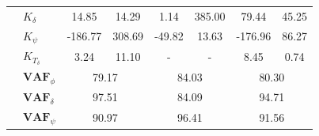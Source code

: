 \begin{table}[]
\begin{tabular}{llcccccc}
                                 & $K_\delta $           & 14.85                                      & 14.29                                              & 1.14                                       & 385.00                                             & 79.44                                      & 45.25                                              \\
                                 & $K_\psi $             & -186.77                                    & 308.69                                             & -49.82                                     & 13.63                                              & -176.96                                    & 86.27                                              \\
                                 & $K_{T_\delta}$        & 3.24                                       & 11.10                                              & -                                          & -                                                  & 8.45                                       & 0.74                                               \\ \cline{2-8} 
                                 & $\mathbf{VAF}_\phi$   & \multicolumn{2}{c}{79.17}                                                                       & \multicolumn{2}{c}{84.03}                                                                       & \multicolumn{2}{c}{80.30}                                                                       \\
                                 & $\mathbf{VAF}_\delta$ & \multicolumn{2}{c}{97.51}                                                                       & \multicolumn{2}{c}{84.09}                                                                       & \multicolumn{2}{c}{94.71}                                                                       \\
                                 & $\mathbf{VAF}_\psi$   & \multicolumn{2}{c}{90.97}                                                                       & \multicolumn{2}{c}{96.41}                                                                       & \multicolumn{2}{c}{91.56}                                                                      
    \end{tabular}
    \label{tb:no_delay}
    \end{table}
